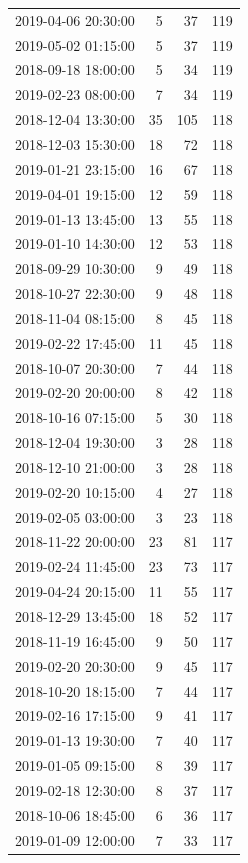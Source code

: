 \begin{tabular}{lrrr}
2019-04-06 20:30:00 & 5 & 37 & 119 \\
2019-05-02 01:15:00 & 5 & 37 & 119 \\
2018-09-18 18:00:00 & 5 & 34 & 119 \\
2019-02-23 08:00:00 & 7 & 34 & 119 \\
2018-12-04 13:30:00 & 35 & 105 & 118 \\
2018-12-03 15:30:00 & 18 & 72 & 118 \\
2019-01-21 23:15:00 & 16 & 67 & 118 \\
2019-04-01 19:15:00 & 12 & 59 & 118 \\
2019-01-13 13:45:00 & 13 & 55 & 118 \\
2019-01-10 14:30:00 & 12 & 53 & 118 \\
2018-09-29 10:30:00 & 9 & 49 & 118 \\
2018-10-27 22:30:00 & 9 & 48 & 118 \\
2018-11-04 08:15:00 & 8 & 45 & 118 \\
2019-02-22 17:45:00 & 11 & 45 & 118 \\
2018-10-07 20:30:00 & 7 & 44 & 118 \\
2019-02-20 20:00:00 & 8 & 42 & 118 \\
2018-10-16 07:15:00 & 5 & 30 & 118 \\
2018-12-04 19:30:00 & 3 & 28 & 118 \\
2018-12-10 21:00:00 & 3 & 28 & 118 \\
2019-02-20 10:15:00 & 4 & 27 & 118 \\
2019-02-05 03:00:00 & 3 & 23 & 118 \\
2018-11-22 20:00:00 & 23 & 81 & 117 \\
2019-02-24 11:45:00 & 23 & 73 & 117 \\
2019-04-24 20:15:00 & 11 & 55 & 117 \\
2018-12-29 13:45:00 & 18 & 52 & 117 \\
2018-11-19 16:45:00 & 9 & 50 & 117 \\
2019-02-20 20:30:00 & 9 & 45 & 117 \\
2018-10-20 18:15:00 & 7 & 44 & 117 \\
2019-02-16 17:15:00 & 9 & 41 & 117 \\
2019-01-13 19:30:00 & 7 & 40 & 117 \\
2019-01-05 09:15:00 & 8 & 39 & 117 \\
2019-02-18 12:30:00 & 8 & 37 & 117 \\
2018-10-06 18:45:00 & 6 & 36 & 117 \\
2019-01-09 12:00:00 & 7 & 33 & 117 \\

\end{tabular}

